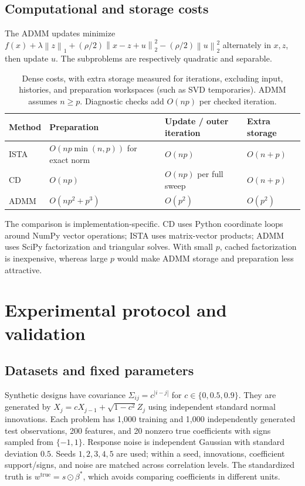 \documentclass{article}
\newcommand{\norm}[1]{\left\|#1\right\|}
\begin{document}
\subsection{Computational and storage costs}
The ADMM updates minimize $f(x)+\lambda\norm{z}_1+(\rho/2)\norm{x-z+u}_2^2-(\rho/2)\norm{u}_2^2$ alternately in $x,z$, then update $u$. The subproblems are respectively quadratic and separable.

\begin{table}[ht]
\centering\small
\begin{tabular}{llll}
\toprule
Method & Preparation & Update / outer iteration & Extra storage\\
\midrule
ISTA & $O(np\min(n,p))$ for exact norm & $O(np)$ & $O(n+p)$\\
CD & $O(np)$ & $O(np)$ per full sweep & $O(n+p)$\\
ADMM & $O(np^2+p^3)$ & $O(p^2)$ & $O(p^2)$\\
\bottomrule
\end{tabular}
\caption{Dense costs, with extra storage measured for iterations, excluding input, histories, and preparation workspaces (such as SVD temporaries). ADMM assumes $n\ge p$. Diagnostic checks add $O(np)$ per checked iteration.}
\label{tab:complexity}
\end{table}

The comparison is implementation-specific. CD uses Python coordinate loops around NumPy vector operations; ISTA uses matrix-vector products; ADMM uses SciPy factorization and triangular solves. With small $p$, cached factorization is inexpensive, whereas large $p$ would make ADMM storage and preparation less attractive.

\section{Experimental protocol and validation}
\subsection{Datasets and fixed parameters}
Synthetic designs have covariance $\Sigma_{ij}=c^{|i-j|}$ for $c\in\{0,0.5,0.9\}$. They are generated by $X_j=cX_{j-1}+\sqrt{1-c^2}Z_j$ using independent standard normal innovations. Each problem has 1,000 training and 1,000 independently generated test observations, 200 features, and 20 nonzero true coefficients with signs sampled from $\{-1,1\}$. Response noise is independent Gaussian with standard deviation $0.5$. Seeds $1,2,3,4,5$ are used; within a seed, innovations, coefficient support/signs, and noise are matched across correlation levels. The standardized truth is $w^{\mathrm{true}}=s\odot\beta^*$, which avoids comparing coefficients in different units.
\end{document}
